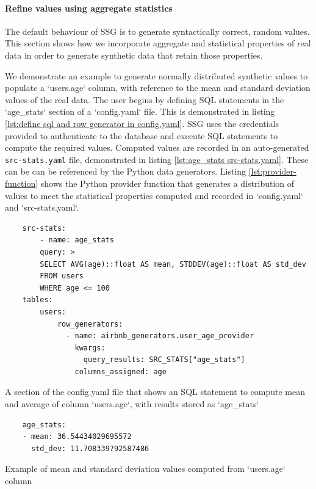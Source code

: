\documentclass[11pt]{article}
\begin{document}
\paragraph{Refine values using aggregate statistics}

The default behaviour of SSG is to generate syntactically correct, random values. This section shows how we incorporate aggregate and statistical properties of real data in order to generate synthetic data that retain those properties. 

We demonstrate an example to generate normally distributed synthetic values to populate a `users.age` column, with reference to the mean and standard deviation values of the real data. The user begins by defining SQL statements in the `age\_stats` section of a `config.yaml` file. This is demonstrated in listing \ref{lst:define sql and row generator in config.yaml}. SSG uses the credentials provided to authenticate to the database and execute SQL statements to compute the required values. Computed values are recorded in an auto-generated \texttt{src-stats.yaml} file, demonstrated in listing \ref{lst:age_stats src-stats.yaml}. These can be can be referenced by the Python data generators. Listing \ref{lst:provider-function} shows the Python provider function that generates a distribution of values to meet the statistical properties computed and recorded in `config.yaml` and `src-stats.yaml`.

\begin{listing}[H]
\begin{verbatim}
    src-stats:
        - name: age_stats
        query: >
        SELECT AVG(age)::float AS mean, STDDEV(age)::float AS std_dev
        FROM users
        WHERE age <= 100
    tables:
        users:
            row_generators:
              - name: airbnb_generators.user_age_provider
                kwargs:
                  query_results: SRC_STATS["age_stats"]
                columns_assigned: age
\end{verbatim}
\caption{A section of the config.yaml file that shows an SQL statement to compute mean and average of column `users.age`, with results stored as `age_stats` }
\label{lst:define sql and row generator in config.yaml}
\end{listing}

\begin{listing}[H]
\begin{verbatim}
    age_stats:
    - mean: 36.54434029695572
      std_dev: 11.708339792587486
\end{verbatim}
\caption{Example of mean and standard deviation values computed from `users.age` column}
\label{lst:age_stats src-stats.yaml}
\end{listing}
\end{document}
